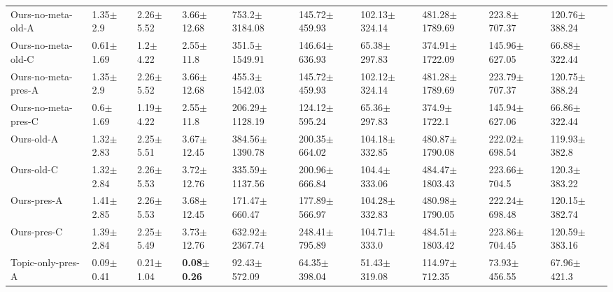 \begin{tabular}{llllllllll}
Ours-no-meta-old-A  &            1.35$\pm$2.9 &           2.26$\pm$5.52 &          3.66$\pm$12.68 &          753.2$\pm$3184.08 &          145.72$\pm$459.93 &          102.13$\pm$324.14 &      481.28$\pm$1789.69 &        223.8$\pm$707.37 &       120.76$\pm$388.24 \\
Ours-no-meta-old-C  &           0.61$\pm$1.69 &            1.2$\pm$4.22 &           2.55$\pm$11.8 &          351.5$\pm$1549.91 &          146.64$\pm$636.93 &           65.38$\pm$297.83 &      374.91$\pm$1722.09 &       145.96$\pm$627.05 &        66.88$\pm$322.44 \\
Ours-no-meta-pres-A &            1.35$\pm$2.9 &           2.26$\pm$5.52 &          3.66$\pm$12.68 &          455.3$\pm$1542.03 &          145.72$\pm$459.93 &          102.12$\pm$324.14 &      481.28$\pm$1789.69 &       223.79$\pm$707.37 &       120.75$\pm$388.24 \\
Ours-no-meta-pres-C &            0.6$\pm$1.69 &           1.19$\pm$4.22 &           2.55$\pm$11.8 &         206.29$\pm$1128.19 &          124.12$\pm$595.24 &           65.36$\pm$297.83 &        374.9$\pm$1722.1 &       145.94$\pm$627.06 &        66.86$\pm$322.44 \\
Ours-old-A          &           1.32$\pm$2.83 &           2.25$\pm$5.51 &          3.67$\pm$12.45 &         384.56$\pm$1390.78 &          200.35$\pm$664.02 &          104.18$\pm$332.85 &      480.87$\pm$1790.08 &       222.02$\pm$698.54 &        119.93$\pm$382.8 \\
Ours-old-C          &           1.32$\pm$2.84 &           2.26$\pm$5.53 &          3.72$\pm$12.76 &         335.59$\pm$1137.56 &          200.96$\pm$666.84 &           104.4$\pm$333.06 &      484.47$\pm$1803.43 &        223.66$\pm$704.5 &        120.3$\pm$383.22 \\
Ours-pres-A         &           1.41$\pm$2.85 &           2.26$\pm$5.53 &          3.68$\pm$12.45 &          171.47$\pm$660.47 &          177.89$\pm$566.97 &          104.28$\pm$332.83 &      480.98$\pm$1790.05 &       222.24$\pm$698.48 &       120.15$\pm$382.74 \\
Ours-pres-C         &           1.39$\pm$2.84 &           2.25$\pm$5.49 &          3.73$\pm$12.76 &         632.92$\pm$2367.74 &          248.41$\pm$795.89 &           104.71$\pm$333.0 &      484.51$\pm$1803.42 &       223.86$\pm$704.45 &       120.59$\pm$383.16 \\
Topic-only-pres-A   &           0.09$\pm$0.41 &           0.21$\pm$1.04 &  \textbf{0.08$\pm$0.26} &           92.43$\pm$572.09 &           64.35$\pm$398.04 &           51.43$\pm$319.08 &       114.97$\pm$712.35 &        73.93$\pm$456.55 &         67.96$\pm$421.3 \\

\end{tabular}
